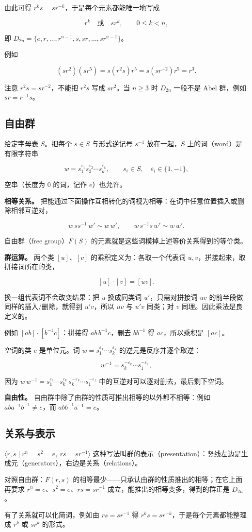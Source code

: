 由此可得 $r^ks=sr^{-k}$，于是每个元素都能唯一地写成

\[r^k\quad\text{或}\quad sr^k,\qquad 0\le k<n,\]

即 $D_{2n}=\{e,r,\ldots,r^{n-1},s,sr,\ldots,sr^{n-1}\}$。

例如

\[(sr^2)(sr^5)=s(r^2s)r^5=s(sr^{-2})r^5=r^3.\]

注意 $r^2s=sr^{-2}$，不能把 $r^2s$ 写成 $sr^2$。当 $n\ge3$ 时 $D_{2n}$ 一般不是 Abel 群，例如 $sr=r^{-1}s$。

\subsection{自由群}


给定字母表 $S$。把每个 $s\in S$ 与形式逆记号 $s^{-1}$ 放在一起，$S$ 上的词（word）是有限字符串

\[w=s_1^{\varepsilon_1}s_2^{\varepsilon_2}\cdots s_k^{\varepsilon_k},\qquad s_i\in S,\quad \varepsilon_i\in\{1,-1\},\]

空串（长度为 $0$ 的词，记作 $e$）也允许。

\textbf{相等关系。} 把能通过下面操作互相转化的词视为相等：在词中任意位置插入或删除相邻互逆对，

\[w\,ss^{-1}\,w'\sim w\,w',\qquad w\,s^{-1}s\,w'\sim w\,w'.\]

自由群（free group）$F(S)$ 的元素就是这些词模掉上述等价关系得到的等价类。

\textbf{群运算。} 两个类 $[u]$、$[v]$ 的乘积定义为：各取一个代表词 $u,v$，拼接起来，取拼接词所在的类，

\[[u]\cdot[v]=[uv].\]

换一组代表词不会改变结果：把 $u$ 换成同类词 $u'$，只需对拼接词 $uv$ 的前半段做同样的插入/删除，就得到 $u'v$，所以 $uv$ 与 $u'v$ 同类；对 $v$ 同理。因此乘法是良定义的。

例如 $[ab]\cdot[b^{-1}c]$：拼接得 $ab\,b^{-1}c$，删去 $bb^{-1}$ 得 $ac$，所以乘积是 $[ac]$。

空词的类 $e$ 是单位元。词 $w=s_1^{\varepsilon_1}\cdots s_k^{\varepsilon_k}$ 的逆元是反序并逐个取逆：

\[w^{-1}=s_k^{-\varepsilon_k}\cdots s_1^{-\varepsilon_1},\]

因为 $w\,w^{-1}=s_1^{\varepsilon_1}\cdots s_k^{\varepsilon_k}\,s_k^{-\varepsilon_k}\cdots s_1^{-\varepsilon_1}$ 中的互逆对可以逐对删去，最后剩下空词。

\textbf{自由性。} 自由群中除了由群的性质可推出相等的以外都不相等：例如 $aba^{-1}b^{-1}\ne e$，而 $abb^{-1}a^{-1}=e$。

\subsection{关系与表示}


$\langle r,s\mid r^n=s^2=e,\ rs=sr^{-1}\rangle$ 这种写法叫群的表示（presentation）：竖线左边是生成元（generators），右边是关系（relations）。

对照自由群：$F(r,s)$ 的相等最少——只承认由群的性质推出的相等；在它上面再要求 $r^n=e$、$s^2=e$、$rs=sr^{-1}$ 成立，能推出的相等变多，得到的群正是 $D_{2n}$。

有了关系就可以化简词，例如由 $rs=sr^{-1}$ 得 $r^ks=sr^{-k}$，于是每个元素都能整理成 $r^k$ 或 $sr^k$ 的形式。
